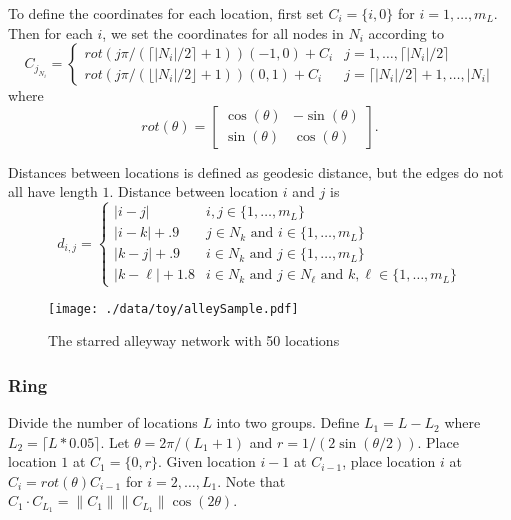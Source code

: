 \documentclass[11pt]{article}
\begin{document}
To define the coordinates for each location, first set $C_{i} =
    \lbrace i,0 \rbrace$ for $i = 1,\ldots,m_L$.  Then for each $i$,
we set the coordinates for all nodes in $N_i$ according to
\begin{equation*}
  C_{j_{N_i}} = 
  \begin{cases}
    rot(j\pi/(\lceil |N_i|/2 \rceil + 1)) (-1,0) + C_i & j = 1,\ldots,
    \lceil |N_i|/2 \rceil\\
    rot(j\pi/(\lfloor |N_i|/2 \rfloor + 1)) (0,1) + C_i & j = \lceil
    |N_i|/2 \rceil + 1,\ldots,|N_i|
  \end{cases}  
\end{equation*}
where
\begin{equation*}
rot(\theta) = \left[
\begin{matrix}
\cos(\theta) & -\sin(\theta)\\
\sin(\theta) & \cos(\theta)
\end{matrix}
\right].
\end{equation*}

Distances between locations is defined as geodesic distance, but
the edges do not all have length $1$.  Distance between location
$i$ and $j$ is
\begin{equation*}
  d_{i,j} = 
  \begin{cases}
    | i - j | & i,j \in \lbrace 1,\ldots,m_L \rbrace\\
    | i - k | + .9 & j \in N_k \text{ and } i \in \lbrace 1,\ldots,m_L
    \rbrace\\
    | k - j | + .9 & i \in N_k \text{ and } j \in \lbrace 1,\ldots,m_L
    \rbrace\\
    | k - \ell| + 1.8 & i \in N_k \text{ and } j \in N_\ell \text{ and
      } k,\ell \in \lbrace 1,\ldots,m_L \rbrace
  \end{cases}
\end{equation*}


\begin{figure}[htb]
\centering
\texttt{[image: ./data/toy/alleySample.pdf]}
\caption{\label{fig:alley50}The starred alleyway network with 50 locations}
\end{figure}



\subsubsection{Ring}
\label{sec-3-1-3}

Divide the number of locations $L$ into two groups.  Define $L_1 =
    L - L_2$ where $L_2 = \lceil L*0.05 \rceil$.  Let $\theta =
    2\pi/(L_1+1)$ and $r = 1/(2\sin(\theta/2))$.  Place location $1$
at $C_1 = \lbrace 0,r \rbrace$.  Given location $i-1$ at
$C_{i-1}$, place location $i$ at $C_i = rot(\theta) C_{i-1}$ for
$i = 2,\ldots,L_1$.  Note that $C_{1} \cdot C_{L_1} = \|C_{1}\|
    \|C_{L_1}\| \cos(2\theta)$.
\end{document}
